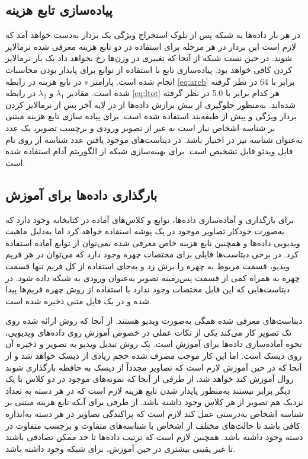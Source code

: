 \subsection{پیاده‌سازی تابع هزینه}
در هر بار  داده‌ها به شبکه پس از بلوک استخراج ویژگی یک بردار به‌دست خواهد آمد که لازم است این بردار در هر مرحله برای استفاده در دو تابع هزینه معرفی شده نرمالایز شوند. در حین تست شبکه از آنجا که تغییری در وزن‌ها رخ نخواهد داد یک بار نرمالایز کردن کافی خواهد بود. پیاده‌سازی تابع  با استفاده از توابع  برای پایدار بودن محاسبات انجام شده است. پارامتر 
$s$
در تابع هزینه
در رابطه 
\ref{eq:arcb}
برابر با 64 در نظر گرفته شده است. مقادیر 
$\lambda_1$
و
$\lambda_2$
 در رابطه 
\ref{eq:ltot}
 هر کدام برابر با 
5.0
 در نظر گرفته شده‌اند.
 به‌منظور جلوگیری از بیش برازش داده‌ها از 
\cite{srivastava2014dropout}
در لایه آخر پس از نرمالایز کردن بردار ویژگی و پیش از طبقه‌بند استفاده شده است. 
برای پیاده سازی تابع هزینه مبتنی بر شناسه اشخاص نیاز است به غیر از تصویر ورودی و برچسب تصویر، یک عدد به‌عنوان شناسه نیز در اختیار باشد. در دیتاست‌های موجود یافتن عدد شناسه از روی نام فایل ویدئو قابل تشخیص است. برای بهینه‌سازی شبکه از الگوریتم آدام 
\cite{kingma2014adam}
استفاده شده است.
\subsection{بارگذاری داده‌ها برای آموزش}
برای بارگذاری و آماده‌سازی داده‌ها، توابع و کلاس‌های آماده در کتابخانه  وجود دارد که به‌صورت خودکار تصاویر موجود در یک پوشه استفاده خواهد کرد اما به‌دلیل ماهیت ویدیویی داده‌ها و همچنین تابع هزینه خاص معرفی شده نمی‌توان از توابع آماده استفاده کرد.
در برخی دیتاست‌ها فایلی برای مختصات چهره وجود دارد که می‌توان در هر فریم ویدیو، قسمت مربوط به چهره را برش زد و به‌جای استفاده از کل فریم تنها قسمت چهره به همراه کمی از قسمت پس‌زمینه تصویر به‌عنوان ورودی به شبکه داده شود. در دیتاست‌هایی که این فایل مختصات وجود ندارد با استفاده از روش 
\cite{zhang2016joint}
 چهره فریم‌ها پیدا شده و در یک فایل متنی ذخیره شده است.
 
دیتاست‌های معرفی شده همگی به‌صورت ویدیو هستند. از آنجا که روش ارائه شده روی تک تصویر کار می‌کند یکی از نکات عملی در خصوص آموزش روی داده‌های ویدیویی، نحوه آماده‌سازی داده‌ها برای آموزش است. یک روش تبدیل ویدیو به تصویر و ذخیره آن روی دیسک است. اما این کار موجب مصرف شده حجم زیادی از دیسک خواهد شد و از آنجا که در حین آموزش لازم است که تصاویر مجدداً از دیسک به حافظه  بارگذاری شوند روال آموزش کند خواهد شد.
از طرفی از آنجا که نمونه‌های موجود در دو کلاس با یک دیگر برابر نیستند به‌منظور پایدار شدن تابع هزینه  لازم است که در هر دسته به تعداد نزدیک هم تصویر از هر کلاس وجود داشته باشد. از طرفی برای آنکه تابع هزینه مبتنی بر شناسه اشخاص به‌درستی عمل کند لازم است که پراکندگی تصاویر در هر دسته به‌اندازه کافی باشد تا حالت‌های مختلف از اشخاص با شناسه‌های متفاوت و برچسب متفاوت در دسته وجود داشته باشد. همچنین لازم است که ترتیب داده‌ها تا حد ممکن تصادفی باشند تا غیر یقینی بیشتری در حین آموزش، برای شبکه وجود داشته باشد. 

